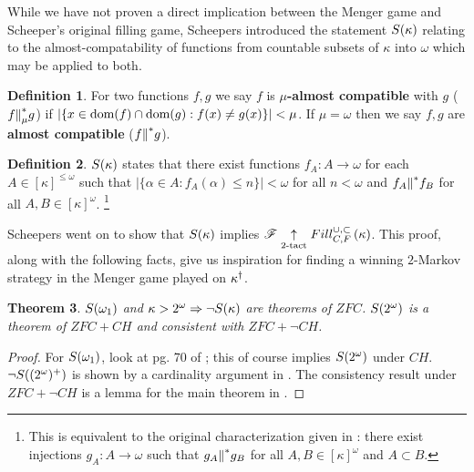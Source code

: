 \documentclass{amsart}
\newtheorem{theorem}{Theorem}[section]
\theoremstyle{definition}
\newtheorem{definition}[theorem]{Definition}
\begin{document}
While we have not proven a direct implication between the Menger game and
Scheeper's original filling game, Scheepers introduced the statement
\(S(\kappa)\) relating to the almost-compatability of functions
from countable subsets of \(\kappa\) into \(\omega\) which may be applied to
both.

\begin{definition}
  For two functions \(f,g\) we say \(f\) is \textbf{\(\mu\)-almost compatible} with
  \(g\) (\(f{\parallel}^*_\mu g\)) if \(|\{x\in\textrm{dom}(f)\cap\textrm{dom}(g):f(x)\not=g(x)\}|<\mu\).
  If \(\mu=\omega\) then we say \(f,g\) are \textbf{almost compatible}
  (\(f{\parallel}^* g\)).
\end{definition}

\begin{definition}
  \(S(\kappa)\) states that there exist functions
  \(f_A:A\to\omega\) for each \(A\in[\kappa]^{\leq\omega}\) such that
  \(|\{\alpha\in A:f_A(\alpha)\leq n\}|<\omega\) for all \(n<\omega\) and
  \(f_A{\parallel}^* f_B\) for all \(A,B\in[\kappa]^\omega\).
  \footnote{
  This is equivalent to the original characterization given in
  \cite{MR1129143}: there exist injections \(g_A:A\to\omega\)
  such that \(g_A{\parallel}^* g_B\) for all \(A,B\in[\kappa]^\omega\) and \(A\subset B\).
  }
\end{definition}

Scheepers went on to show that \(S(\kappa)\) implies
\(\mathscr{F} \underset{2\text{-tact}}{\uparrow} Fill^{\cup,\subset}_{C,F}\left({\kappa}\right)\). This proof, along with the following
facts, give us inspiration for
finding a winning \(2\)-Markov strategy in the Menger game played on
\(\kappa^\dagger\).

\begin{theorem}
  \(S(\omega_1)\) and \(\kappa>2^\omega\Rightarrow\neg S(\kappa)\)
  are theorems of \(ZFC\).
  \(S(2^\omega)\) is a theorem of \(ZFC+CH\) and consistent with
  \(ZFC+\neg CH\).
\end{theorem}

\begin{proof}
  For \(S(\omega_1)\), look at pg. 70 of \cite{MR597342}; this of course
  implies \(S(2^\omega)\) under \(CH\).
  \(\neg S((2^\omega)^+)\) is shown by a cardinality argument
  in \cite{MR1129143}.
  The consistency result under \(ZFC+\neg CH\)
  is a lemma for the main theorem in \cite{MR1129143}.
\end{proof}
\end{document}
